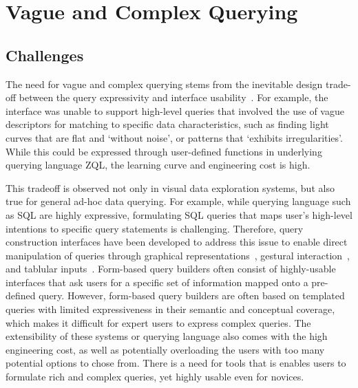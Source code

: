 \section{Vague and Complex Querying\label{sec:vague}}
\subsection{Challenges}
\par The need for vague and complex querying stems from the inevitable design trade-off between the query expressivity and interface usability~\cite{Morton2014,Jagadish2007}. For example, the \zv interface was unable to support high-level queries that involved the use of vague descriptors for matching to specific data characteristics, such as finding light curves that are flat and `without noise', or patterns that `exhibits irregularities'. While this could be expressed through user-defined functions in underlying querying language ZQL, the learning curve and engineering cost is high.
\par This tradeoff is observed not only in visual data exploration systems, but also true for general ad-hoc data querying. For example, while querying language such as SQL are highly expressive, formulating SQL queries that maps user's high-level intentions to specific query statements is challenging. Therefore, query construction interfaces have been developed to address this issue to enable direct manipulation of queries through graphical representations~\cite{Abouzied2012}, gestural interaction~\cite{Nandi2013}, and tablular inputs~\cite{Zloof1975}. Form-based query builders often consist of highly-usable interfaces that ask users for a specific set of information mapped onto a pre-defined query. However, form-based query builders are often based on templated queries with limited expressiveness in their semantic and conceptual coverage, which makes it difficult for expert users to express complex queries. The extensibility of these systems or querying language also comes with the high engineering cost, as well as potentially overloading the users with too many potential options to chose from. There is a need for tools that is enables users to formulate rich and complex queries, yet highly usable even for novices.  


